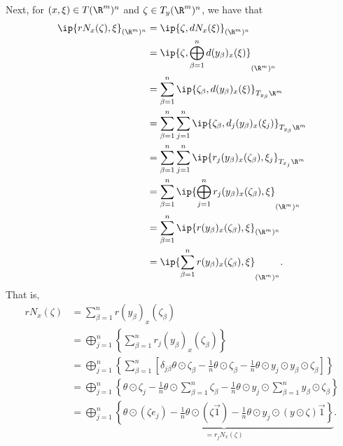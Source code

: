 Next, for $(x,\xi)\in T(\R^m)^n$ and $\zeta\in T_y(\R^m)^n$, we have that
\begin{align*}
	\ip{rN_x(\zeta),\xi}_{(\R^m)^n}&=\ip{\zeta,dN_x(\xi)}_{(\R^m)^n}\\
	&=\ip{\zeta,\bigoplus_{\beta=1}^n d(y_\beta)_x(\xi)}_{(\R^m)^n}\\
	&=\sum_{\beta=1}^n\ip{\zeta_\beta,d(y_\beta)_x(\xi)}_{T_{y_\beta}\R^m}\\
	&=\sum_{\beta=1}^n\sum_{j=1}^n\ip{\zeta_\beta,d_j(y_\beta)_x(\xi_j)}_{T_{y_\beta}\R^m}\\
	&=\sum_{\beta=1}^n\sum_{j=1}^n\ip{r_j(y_\beta)_x(\zeta_\beta),\xi_j}_{T_{x_j}\R^m}\\
	&=\sum_{\beta=1}^n\ip{\bigoplus_{j=1}^nr_j(y_\beta)_x(\zeta_\beta),\xi}_{(\R^m)^n}\\
	&=\sum_{\beta=1}^n\ip{r(y_\beta)_x(\zeta_\beta),\xi}_{(\R^m)^n}\\
	&=\ip{\sum_{\beta=1}^nr(y_\beta)_x(\zeta_\beta),\xi}_{(\R^m)^n}.
\end{align*}
That is,
\begin{align*}
	rN_x(\zeta)&=\sum_{\beta=1}^nr(y_\beta)_x(\zeta_\beta)\\
	&=\bigoplus_{j=1}^n\left\{\sum_{\beta=1}^nr_j(y_\beta)_x(\zeta_\beta)\right\}\\
	&=\bigoplus_{j=1}^n\left\{\sum_{\beta=1}^n\left[\delta_{j\beta}\theta\odot\zeta_\beta-\frac{1}{n}\theta\odot\zeta_\beta-\frac{1}{n}\theta\odot y_j\odot y_\beta\odot\zeta_\beta\right]\right\}\\
	&=\bigoplus_{j=1}^n\left\{\theta\odot\zeta_j-\frac{1}{n}\theta\odot\sum_{\beta=1}^n\zeta_\beta -\frac{1}{n}\theta\odot y_j\odot\sum_{\beta=1}^ny_\beta\odot\zeta_\beta\right\}\\
	&=\bigoplus_{j=1}^n\underbrace{\left\{\theta\odot(\zeta e_j)-\frac{1}{n}\theta\odot(\zeta\vec{1})-\frac{1}{n}\theta\odot y_j\odot(y\odot\zeta)\vec{1}	\right\}}_{=r_j N_x(\zeta)}.
\end{align*}

